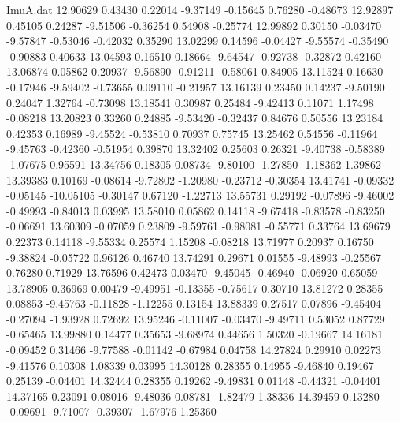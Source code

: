 \begin{filecontents}{ImuA.dat}
  12.90629    0.43430    0.22014   -9.37149   -0.15645    0.76280   -0.48673
  12.92897    0.45105    0.24287   -9.51506   -0.36254    0.54908   -0.25774
  12.99892    0.30150   -0.03470   -9.57847   -0.53046   -0.42032    0.35290
  13.02299    0.14596   -0.04427   -9.55574   -0.35490   -0.90883    0.40633
  13.04593    0.16510    0.18664   -9.64547   -0.92738   -0.32872    0.42160
  13.06874    0.05862    0.20937   -9.56890   -0.91211   -0.58061    0.84905
  13.11524    0.16630   -0.17946   -9.59402   -0.73655    0.09110   -0.21957
  13.16139    0.23450    0.14237   -9.50190    0.24047    1.32764   -0.73098
  13.18541    0.30987    0.25484   -9.42413    0.11071    1.17498   -0.08218
  13.20823    0.33260    0.24885   -9.53420   -0.32437    0.84676    0.50556
  13.23184    0.42353    0.16989   -9.45524   -0.53810    0.70937    0.75745
  13.25462    0.54556   -0.11964   -9.45763   -0.42360   -0.51954    0.39870
  13.32402    0.25603    0.26321   -9.40738   -0.58389   -1.07675    0.95591
  13.34756    0.18305    0.08734   -9.80100   -1.27850   -1.18362    1.39862
  13.39383    0.10169   -0.08614   -9.72802   -1.20980   -0.23712   -0.30354
  13.41741   -0.09332   -0.05145  -10.05105   -0.30147    0.67120   -1.22713
  13.55731    0.29192   -0.07896   -9.46002   -0.49993   -0.84013    0.03995
  13.58010    0.05862    0.14118   -9.67418   -0.83578   -0.83250   -0.06691
  13.60309   -0.07059    0.23809   -9.59761   -0.98081   -0.55771    0.33764
  13.69679    0.22373    0.14118   -9.55334    0.25574    1.15208   -0.08218
  13.71977    0.20937    0.16750   -9.38824   -0.05722    0.96126    0.46740
  13.74291    0.29671    0.01555   -9.48993   -0.25567    0.76280    0.71929
  13.76596    0.42473    0.03470   -9.45045   -0.46940   -0.06920    0.65059
  13.78905    0.36969    0.00479   -9.49951   -0.13355   -0.75617    0.30710
  13.81272    0.28355    0.08853   -9.45763   -0.11828   -1.12255    0.13154
  13.88339    0.27517    0.07896   -9.45404   -0.27094   -1.93928    0.72692
  13.95246   -0.11007   -0.03470   -9.49711    0.53052    0.87729   -0.65465
  13.99880    0.14477    0.35653   -9.68974    0.44656    1.50320   -0.19667
  14.16181   -0.09452    0.31466   -9.77588   -0.01142   -0.67984    0.04758
  14.27824    0.29910    0.02273   -9.41576    0.10308    1.08339    0.03995
  14.30128    0.28355    0.14955   -9.46840    0.19467    0.25139   -0.04401
  14.32444    0.28355    0.19262   -9.49831    0.01148   -0.44321   -0.04401
  14.37165    0.23091    0.08016   -9.48036    0.08781   -1.82479    1.38336
  14.39459    0.13280   -0.09691   -9.71007   -0.39307   -1.67976    1.25360

\end{filecontents}
